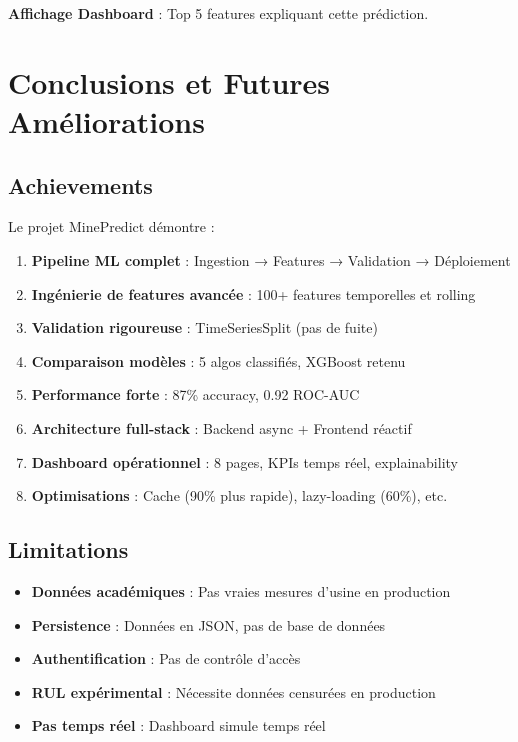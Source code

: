\documentclass[12pt,a4paper,french]{article}
\begin{document}
\textbf{Affichage Dashboard} : Top 5 features expliquant cette prédiction.

\section{Conclusions et Futures Améliorations}

\subsection{Achievements}

Le projet MinePredict démontre :

\begin{enumerate}
    \item \textbf{Pipeline ML complet} : Ingestion → Features → Validation → Déploiement
    \item \textbf{Ingénierie de features avancée} : 100+ features temporelles et rolling
    \item \textbf{Validation rigoureuse} : TimeSeriesSplit (pas de fuite)
    \item \textbf{Comparaison modèles} : 5 algos classifiés, XGBoost retenu
    \item \textbf{Performance forte} : 87\% accuracy, 0.92 ROC-AUC
    \item \textbf{Architecture full-stack} : Backend async + Frontend réactif
    \item \textbf{Dashboard opérationnel} : 8 pages, KPIs temps réel, explainability
    \item \textbf{Optimisations} : Cache (90\% plus rapide), lazy-loading (60\%), etc.
\end{enumerate}

\subsection{Limitations}

\begin{itemize}
    \item \textbf{Données académiques} : Pas vraies mesures d'usine en production
    \item \textbf{Persistence} : Données en JSON, pas de base de données
    \item \textbf{Authentification} : Pas de contrôle d'accès
    \item \textbf{RUL expérimental} : Nécessite données censurées en production
    \item \textbf{Pas temps réel} : Dashboard simule temps réel
\end{itemize}
\end{document}
